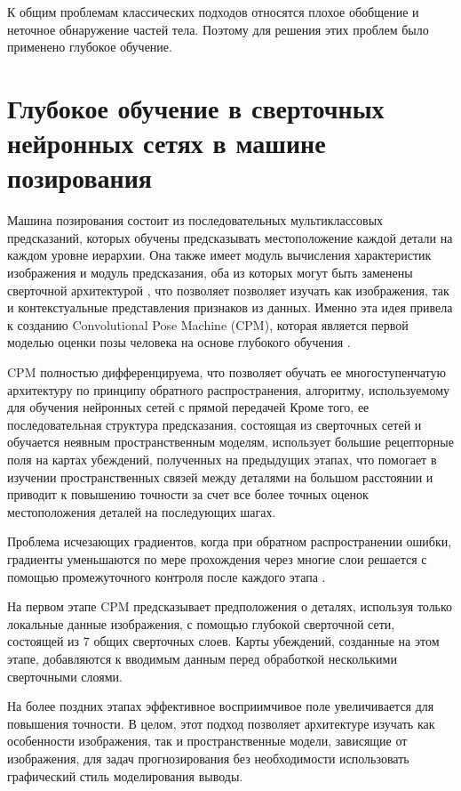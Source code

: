 К общим проблемам классических подходов относятся плохое обобщение и неточное обнаружение частей тела. Поэтому для решения этих проблем было применено глубокое обучение.

\section{Глубокое обучение в сверточных нейронных сетях в машине позирования}

Машина позирования состоит из последовательных мультиклассовых предсказаний, которых обучены предсказывать местоположение каждой детали на каждом уровне иерархии. Она также имеет модуль вычисления характеристик изображения и модуль предсказания, оба из которых могут быть заменены сверточной архитектурой \cite{CNN}, что позволяет позволяет изучать как изображения, так и контекстуальные представления признаков из данных.
Именно эта идея привела к созданию Convolutional Pose Machine (CPM), которая является первой моделью оценки позы человека на основе глубокого обучения \cite{wei2016cpm}.

CPM полностью дифференцируема, что позволяет обучать ее многоступенчатую архитектуру по принципу обратного распространения, алгоритму, используемому для обучения нейронных сетей с прямой передачей 
Кроме того, ее последовательная структура предсказания, состоящая из сверточных сетей и обучается неявным пространственным моделям, использует большие рецепторные поля на картах убеждений, полученных на предыдущих этапах, что помогает в изучении пространственных связей между деталями на большом расстоянии и приводит к повышению точности за счет все более точных оценок местоположения деталей на последующих шагах.

Проблема исчезающих градиентов, когда при обратном распространении ошибки, градиенты уменьшаются по мере прохождения через многие слои решается с помощью промежуточного контроля после каждого этапа \cite{wei2016cpm}.

На первом этапе CPM предсказывает предположения о деталях, используя только локальные данные изображения, с помощью глубокой сверточной сети, состоящей из 7 общих сверточных слоев. Карты убеждений, созданные на этом этапе, добавляются к вводимым данным перед обработкой несколькими сверточными слоями.

На более поздних этапах эффективное восприимчивое поле увеличивается для повышения точности. 
В целом, этот подход позволяет архитектуре изучать как особенности изображения, так и пространственные модели, зависящие от изображения, для задач прогнозирования без необходимости использовать графический стиль моделирования выводы.

